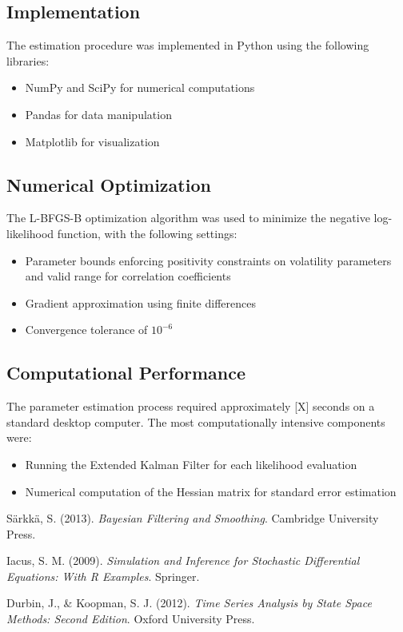 \documentclass[12pt,a4paper]{article}
\begin{document}
\subsection{Implementation}

The estimation procedure was implemented in Python using the following libraries:
\begin{itemize}
    \item NumPy and SciPy for numerical computations
    \item Pandas for data manipulation
    \item Matplotlib for visualization
\end{itemize}

\subsection{Numerical Optimization}

The L-BFGS-B optimization algorithm was used to minimize the negative log-likelihood function, with the following settings:
\begin{itemize}
    \item Parameter bounds enforcing positivity constraints on volatility parameters and valid range for correlation coefficients
    \item Gradient approximation using finite differences
    \item Convergence tolerance of $10^{-6}$
\end{itemize}

\subsection{Computational Performance}

The parameter estimation process required approximately [X] seconds on a standard desktop computer. The most computationally intensive components were:
\begin{itemize}
    \item Running the Extended Kalman Filter for each likelihood evaluation
    \item Numerical computation of the Hessian matrix for standard error estimation
\end{itemize}


\begin{thebibliography}{99}

Särkkä, S. (2013). 
\textit{Bayesian Filtering and Smoothing}. 
Cambridge University Press.

Iacus, S. M. (2009). 
\textit{Simulation and Inference for Stochastic Differential Equations: With R Examples}. 
Springer.

Durbin, J., \& Koopman, S. J. (2012). 
\textit{Time Series Analysis by State Space Methods: Second Edition}. 
Oxford University Press.

\end{thebibliography}
\end{document}
